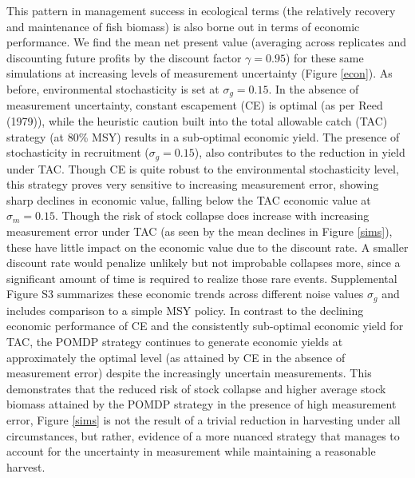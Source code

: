 \documentclass[3p]{elsarticle} %
\begin{document}
This pattern in management success in ecological terms (the relatively
recovery and maintenance of fish biomass) is also borne out in terms of
economic performance. We find the mean net present value (averaging
across replicates and discounting future profits by the discount factor
\(\gamma = 0.95\)) for these same simulations at increasing levels of
measurement uncertainty (Figure \ref{econ}). As before, environmental
stochasticity is set at \(\sigma_g = 0.15\). In the absence of
measurement uncertainty, constant escapement (CE) is optimal (as per
Reed (1979)), while the heuristic caution built into the total allowable
catch (TAC) strategy (at 80\% MSY) results in a sub-optimal economic
yield. The presence of stochasticity in recruitment
(\(\sigma_g = 0.15\)), also contributes to the reduction in yield under
TAC. Though CE is quite robust to the environmental stochasticity level,
this strategy proves very sensitive to increasing measurement error,
showing sharp declines in economic value, falling below the TAC economic
value at \(\sigma_m = 0.15\). Though the risk of stock collapse does
increase with increasing measurement error under TAC (as seen by the
mean declines in Figure \ref{sims}), these have little impact on the
economic value due to the discount rate. A smaller discount rate would
penalize unlikely but not improbable collapses more, since a significant
amount of time is required to realize those rare events. Supplemental
Figure S3 summarizes these economic trends across different noise values
\(\sigma_g\) and includes comparison to a simple MSY policy. In contrast
to the declining economic performance of CE and the consistently
sub-optimal economic yield for TAC, the POMDP strategy continues to
generate economic yields at approximately the optimal level (as attained
by CE in the absence of measurement error) despite the increasingly
uncertain measurements. This demonstrates that the reduced risk of stock
collapse and higher average stock biomass attained by the POMDP strategy
in the presence of high measurement error, Figure \ref{sims} is not the
result of a trivial reduction in harvesting under all circumstances, but
rather, evidence of a more nuanced strategy that manages to account for
the uncertainty in measurement while maintaining a reasonable harvest.
\end{document}
